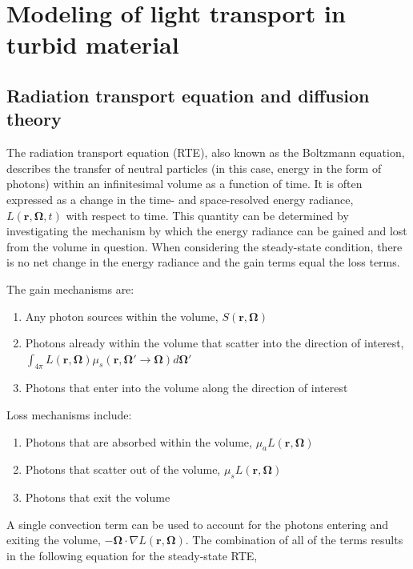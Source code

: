 \section{Modeling of light transport in turbid material}

\subsection{Radiation transport equation and diffusion theory}
The radiation transport equation (RTE), also known as the Boltzmann equation, describes the transfer of neutral particles (in this case, energy in the form of photons) within an infinitesimal volume as a function of time.\cite{Duderstadt1976} It is often expressed as a change in the time- and space-resolved energy radiance, $L(\mathbf{r},\mathbf{\Omega},t)$ with respect to time. This quantity can be determined by investigating the mechanism by which the energy radiance can be gained and lost from the volume in question. When considering the steady-state condition, there is no net change in the energy radiance and the gain terms equal the loss terms.

\noindent The gain mechanisms are:
\begin{enumerate}
	\item Any photon sources within the volume, $ S(\mathbf{r},\mathbf{\Omega}) $
	\item Photons already within the volume that scatter into the direction of interest,  $\int_{4\pi} L(\mathbf{r},\mathbf{\Omega}) \mu_s(\mathbf{r},\mathbf{\Omega}' \rightarrow \mathbf{\Omega}) d \mathbf{\Omega'} $
	\item Photons that enter into the volume along the direction of interest
\end{enumerate}

\noindent Loss mechanisms include:
\begin{enumerate}
	\item Photons that are absorbed within the volume, $ \mu_a L(\mathbf{r},\mathbf{\Omega}) $
	\item Photons that scatter out of the volume, $ \mu_s L(\mathbf{r},\mathbf{\Omega}) $
	\item Photons that exit the volume
\end{enumerate}

\noindent A single convection term can be used to account for the photons entering and exiting the volume, $-\mathbf{\Omega}\cdot\nabla L(\mathbf{r},\mathbf{\Omega})$. The combination of all of the terms results in the following equation for the steady-state RTE,\cite{Farrell2003}

